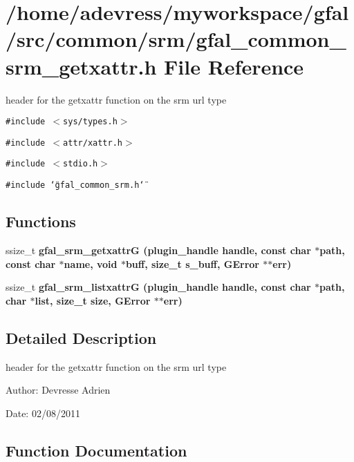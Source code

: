 \section{/home/adevress/myworkspace/gfal/src/common/srm/gfal\_\-common\_\-srm\_\-getxattr.h File Reference}
\label{gfal__common__srm__getxattr_8h}
header for the getxattr function on the srm url type 

{\tt \#include $<$sys/types.h$>$}\par
{\tt \#include $<$attr/xattr.h$>$}\par
{\tt \#include $<$stdio.h$>$}\par
{\tt \#include \char`\"{}gfal\_\-common\_\-srm.h\char`\"{}}\par
\subsection*{Functions}
\begin{CompactItemize}
\item 
ssize\_\-t \bf{gfal\_\-srm\_\-getxattr\-G} (plugin\_\-handle handle, const char $\ast$path, const char $\ast$name, void $\ast$buff, size\_\-t s\_\-buff, GError $\ast$$\ast$err)
\item 
ssize\_\-t \bf{gfal\_\-srm\_\-listxattr\-G} (plugin\_\-handle handle, const char $\ast$path, char $\ast$list, size\_\-t size, GError $\ast$$\ast$err)
\end{CompactItemize}


\subsection{Detailed Description}
header for the getxattr function on the srm url type 

\begin{Desc}
\item[Author:]Devresse Adrien \end{Desc}
\begin{Desc}
\item[Date:]02/08/2011 \end{Desc}


\subsection{Function Documentation}
